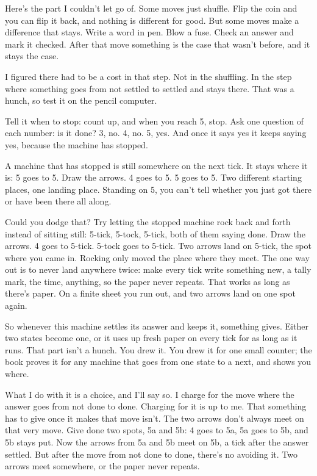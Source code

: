 \documentclass[11pt,twoside]{article}
\theoremstyle{thielethm}
\theoremstyle{thieledef}
\theoremstyle{thieledef}
\theoremstyle{thieledef}
\theoremstyle{thielethm}
\theoremstyle{thieleobs}
\theoremstyle{thielethm}
\begin{document}
Here's the part I couldn't let go of. Some moves just shuffle. Flip the coin and you can flip it back, and nothing is different for good. But some moves make a difference that stays. Write a word in pen. Blow a fuse. Check an answer and mark it checked. After that move something is the case that wasn't before, and it stays the case.

I figured there had to be a cost in that step. Not in the shuffling. In the step where something goes from not settled to settled and stays there. That was a hunch, so test it on the pencil computer.

Tell it when to stop: count up, and when you reach 5, stop. Ask one question of each number: is it done? 3, no. 4, no. 5, yes. And once it says yes it keeps saying yes, because the machine has stopped.

A machine that has stopped is still somewhere on the next tick. It stays where it is: 5 goes to 5. Draw the arrows. 4 goes to 5. 5 goes to 5. Two different starting places, one landing place. Standing on 5, you can't tell whether you just got there or have been there all along.

Could you dodge that? Try letting the stopped machine rock back and forth instead of sitting still: 5-tick, 5-tock, 5-tick, both of them saying done. Draw the arrows. 4 goes to 5-tick. 5-tock goes to 5-tick. Two arrows land on 5-tick, the spot where you came in. Rocking only moved the place where they meet. The one way out is to never land anywhere twice: make every tick write something new, a tally mark, the time, anything, so the paper never repeats. That works as long as there's paper. On a finite sheet you run out, and two arrows land on one spot again.

So whenever this machine settles its answer and keeps it, something gives. Either two states become one, or it uses up fresh paper on every tick for as long as it runs. That part isn't a hunch. You drew it. You drew it for one small counter; the book proves it for any machine that goes from one state to a next, and shows you where.

What I do with it is a choice, and I'll say so. I charge for the move where the answer goes from not done to done. Charging for it is up to me. That something has to give once it makes that move isn't. The two arrows don't always meet on that very move. Give done two spots, 5a and 5b: 4 goes to 5a, 5a goes to 5b, and 5b stays put. Now the arrows from 5a and 5b meet on 5b, a tick after the answer settled. But after the move from not done to done, there's no avoiding it. Two arrows meet somewhere, or the paper never repeats.
\end{document}

